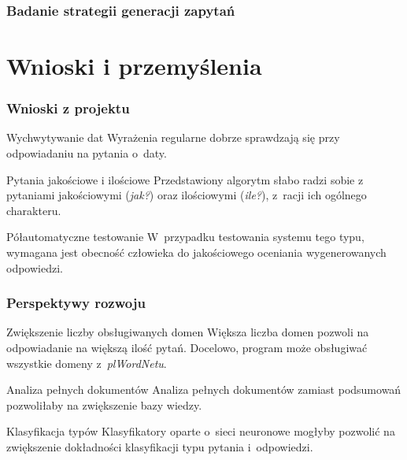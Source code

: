 \documentclass{beamer}
\begin{document}
\begin{frame}
  \frametitle{Badanie strategii generacji zapytań}

\end{frame}

\section{Wnioski i przemyślenia}
\begin{frame}
  \frametitle{Wnioski z projektu}
  \begin{block}{Wychwytywanie dat}
    Wyrażenia regularne dobrze sprawdzają się przy odpowiadaniu na pytania o~daty.
  \end{block}

  \begin{block}{Pytania jakościowe i ilościowe}
    Przedstawiony algorytm słabo radzi sobie z pytaniami jakościowymi (\textit{jak?}) oraz ilościowymi (\textit{ile?}), z~racji ich ogólnego charakteru.
  \end{block}

  \begin{block}{Półautomatyczne testowanie}
    W~przypadku testowania systemu tego typu, wymagana jest obecność człowieka do jakościowego oceniania wygenerowanych odpowiedzi.
  \end{block}
\end{frame}

\begin{frame}
  \frametitle{Perspektywy rozwoju}
  \begin{block}{Zwiększenie liczby obsługiwanych domen}
    Większa liczba domen pozwoli na odpowiadanie na większą ilość pytań. Docelowo, program może obsługiwać wszystkie domeny z~\textit{plWordNetu}.
  \end{block}

  \begin{block}{Analiza pełnych dokumentów}
    Analiza pełnych dokumentów zamiast podsumowań pozwoliłaby na zwiększenie bazy wiedzy.
  \end{block}

  \begin{block}{Klasyfikacja typów}
    Klasyfikatory oparte o~sieci neuronowe mogłyby pozwolić na zwiększenie dokładności klasyfikacji typu pytania i~odpowiedzi.
  \end{block}

\end{frame}
\end{document}
